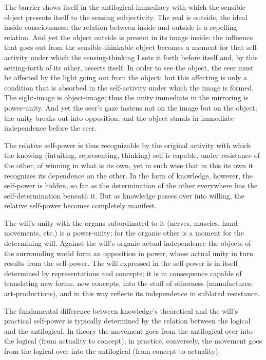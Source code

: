 \documentclass[12pt]{book}
\begin{document}
The barrier shows itself in the antilogical immediacy with which the
sensible object presents itself to the sensing subjectivity. The
real is outside, the ideal inside consciousness: the relation
between inside and outside is a repelling relation. And yet the
object outside is present in its image inside: the influence that
goes out from the sensible-thinkable object becomes a moment for
that self-activity under which the sensing-thinking I sets it forth
before itself and, by this setting-forth of its other, asserts
itself. In order to see the object, the seer must be affected by the
light going out from the object; but this affecting is only a
condition that is absorbed in the self-activity under which the
image is formed. The sight-image is object-image; thus the unity
immediate in the mirroring is power-unity. And yet the seer's gaze
fastens not on the image but on the object; the unity breaks out
into opposition, and the object stands in immediate independence
before the seer.

The relative self-power is thus recognizable by the original
activity with which the knowing (intuiting, representing, thinking)
self is capable, under resistance of the other, of winning in what
is its own, yet in such wise that in this its own it recognizes its
dependence on the other. In the form of knowledge, however, the
self-power is hidden, so far as the determination of the other
everywhere has the self-determination beneath it. But as knowledge
passes over into willing, the relative self-power becomes completely
manifest.

The will's unity with the organs subordinated to it (nerves,
muscles, hand-movements, etc.) is a power-unity;
for the organic other is a moment for the determining
will. Against the will's organic-actual independence the objects of
the surrounding world form an opposition in power, whose actual
unity in turn results from the self-power. The will expressed in the
self-power is in itself determined by representations and concepts;
it is in consequence capable of translating new forms, new concepts,
into the stuff of otherness (manufactures; art-productions), and in
this way reflects its independence in sublated resistance.

The fundamental difference between knowledge's theoretical and the
will's practical self-power is typically determined by the relation
between the logical and the antilogical. In theory the movement goes
from the antilogical over into the logical (from actuality to
concept); in practice, conversely, the movement goes from the
logical over into the antilogical (from concept to actuality).
\end{document}
